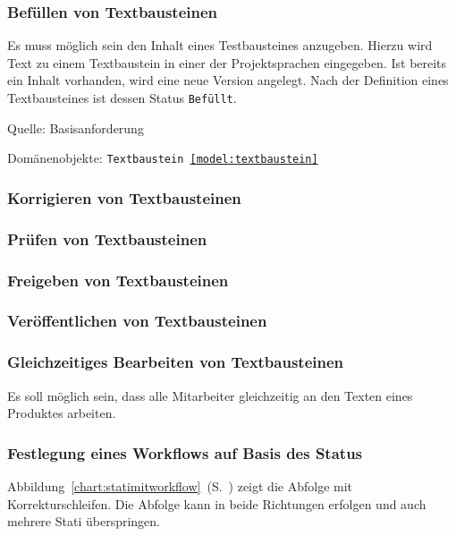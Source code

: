 \subsubsection{Befüllen von Textbausteinen}

Es muss möglich sein den Inhalt eines Testbausteines anzugeben. Hierzu wird Text zu einem Textbaustein in einer der Projektsprachen eingegeben. Ist bereits ein Inhalt vorhanden, wird eine neue Version angelegt. Nach der Definition eines Textbausteines ist dessen Status \texttt{Befüllt}.

\textsf{Quelle:} Basisanforderung

\textsf{Domänenobjekte:} \texttt{Textbaustein \ref{model:textbaustein}}

\TODO

\subsubsection{Korrigieren von Textbausteinen}

\subsubsection{Prüfen von Textbausteinen}

\subsubsection{Freigeben von Textbausteinen}

\subsubsection{Veröffentlichen von Textbausteinen}

\subsubsection{Gleichzeitiges Bearbeiten von Textbausteinen}

Es soll möglich sein, dass alle  Mitarbeiter gleichzeitig an den Texten eines Produktes arbeiten.

\subsubsection{Festlegung eines Workflows auf Basis des Status}

Abbildung~\ref{chart:statimitworkflow}~(S.~\pageref{chart:statimitworkflow}) zeigt die Abfolge mit Korrekturschleifen. Die Abfolge kann in beide Richtungen erfolgen und auch mehrere Stati überspringen.

